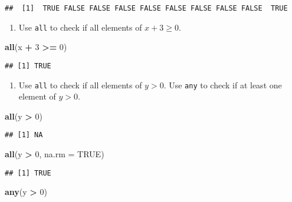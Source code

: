 \documentclass[]{article}
\newenvironment{Shaded}{\begin{snugshade}}{\end{snugshade}}
\newcommand{\KeywordTok}[1]{\textcolor[rgb]{0.13,0.29,0.53}{\textbf{#1}}}
\newcommand{\DataTypeTok}[1]{\textcolor[rgb]{0.13,0.29,0.53}{#1}}
\newcommand{\DecValTok}[1]{\textcolor[rgb]{0.00,0.00,0.81}{#1}}
\newcommand{\StringTok}[1]{\textcolor[rgb]{0.31,0.60,0.02}{#1}}
\newcommand{\OtherTok}[1]{\textcolor[rgb]{0.56,0.35,0.01}{#1}}
\newcommand{\OperatorTok}[1]{\textcolor[rgb]{0.81,0.36,0.00}{\textbf{#1}}}
\newcommand{\NormalTok}[1]{#1}
\providecommand{\tightlist}{%
  \setlength{\itemsep}{0pt}\setlength{\parskip}{0pt}}
\begin{document}
\begin{verbatim}
##  [1]  TRUE FALSE FALSE FALSE FALSE FALSE FALSE FALSE FALSE  TRUE
\end{verbatim}

\begin{enumerate}
\def\labelenumi{\arabic{enumi}.}
\setcounter{enumi}{3}
\tightlist
\item
  Use \texttt{all} to check if all elements of \(x+3\geq 0.\)
\end{enumerate}

\begin{Shaded}
\begin{Highlighting}[]
\KeywordTok{all}\NormalTok{(x }\OperatorTok{+}\StringTok{ }\DecValTok{3} \OperatorTok{>=}\StringTok{ }\DecValTok{0}\NormalTok{)}
\end{Highlighting}
\end{Shaded}

\begin{verbatim}
## [1] TRUE
\end{verbatim}

\begin{enumerate}
\def\labelenumi{\arabic{enumi}.}
\setcounter{enumi}{4}
\tightlist
\item
  Use \texttt{all} to check if all elements of \(y>0.\) Use \texttt{any}
  to check if at least one element of \(y>0.\)
\end{enumerate}

\begin{Shaded}
\begin{Highlighting}[]
\KeywordTok{all}\NormalTok{(y }\OperatorTok{>}\StringTok{ }\DecValTok{0}\NormalTok{)}
\end{Highlighting}
\end{Shaded}

\begin{verbatim}
## [1] NA
\end{verbatim}

\begin{Shaded}
\begin{Highlighting}[]
\KeywordTok{all}\NormalTok{(y }\OperatorTok{>}\StringTok{ }\DecValTok{0}\NormalTok{, }\DataTypeTok{na.rm =} \OtherTok{TRUE}\NormalTok{)}
\end{Highlighting}
\end{Shaded}

\begin{verbatim}
## [1] TRUE
\end{verbatim}

\begin{Shaded}
\begin{Highlighting}[]
\KeywordTok{any}\NormalTok{(y }\OperatorTok{>}\StringTok{ }\DecValTok{0}\NormalTok{)}
\end{Highlighting}
\end{Shaded}
\end{document}
